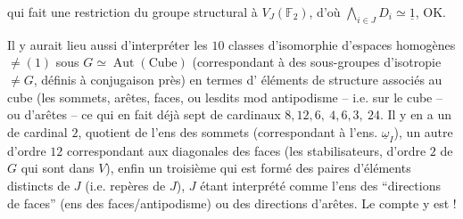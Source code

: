 qui fait une restriction du groupe structural à $V_J(\mathbb{F}_2)$, d'où $\bigwedge_{i\in J}D_i\simeq\underline{1}$, OK.

Il y aurait lieu aussi d'interpréter les $10$ classes d'isomorphie d'espaces homogènes $\ne(1)$ sous $G\simeq\operatorname{Aut}(\text{Cube})$ (correspondant à des  sous-groupes d'isotropie $\ne G$, définis à conjugaison près) en termes d' éléments de structure associés au cube (les sommets, arêtes, faces, ou lesdits mod antipodisme -- i.e. sur le cube  -- ou  d'arêtes -- ce qui en fait déjà sept  de cardinaux $8,12,6,\ 4,6,3,\ 24$.
Il y en a un de cardinal $2$, quotient de l'ens des sommets (correspondant à l'ens. $\underline{\omega}_I$), un autre d'ordre $12$ correspondant aux diagonales des faces  (les stabilisateurs,  d'ordre $2$ de $G$ qui  sont  dans $V$), enfin un troisième qui est formé des paires d'éléments distincts de $J$ (i.e. repères de $J$), $J$ étant interprété comme l'ens des ``directions de faces'' \deleted{\unsure{(=}} (ens des faces/antipodisme) ou des directions d'arêtes. Le compte y est !

